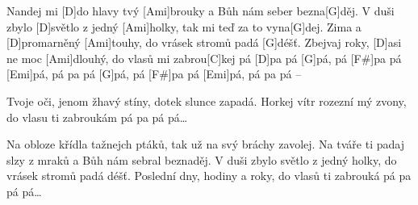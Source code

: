 
\sloka
[G]Nandej mi [D]do hlavy tvý [Ami]brouky
a Bůh nám seber bezna[G]děj.
V duši zbylo [D]světlo z jedný [Ami]holky,
tak mi teď za to vyna[G]dej.
Zima a [D]promarněný [Ami]touhy,
do vrásek stromů padá [G]déšť.
Zbejvaj roky, [D]asi ne moc [Ami]dlouhý,
do vlasů mi zabrou[C]kej
pá [D]pa pá [G]pá, pá [F#]pa pá [Emi]pá,
pá pa pá [G]pá, pá [F#]pa pá [Emi]pá, pá pa pá –

\sloka
Tvoje oči, jenom žhavý stíny,
dotek slunce zapadá.
Horkej vítr rozezní mý zvony,
do vlasu ti zabroukám
pá pa pá pá…

\sloka
Na obloze křídla tažnejch ptáků,
tak už na svý bráchy zavolej.
Na tváře ti padaj slzy z mraků
a Bůh nám sebral beznaděj.
V duši zbylo světlo z jedný holky,
do vrásek stromů padá déšť.
Poslední dny, hodiny a roky,
do vlasů ti zabrouká
pá pa pá pá…
